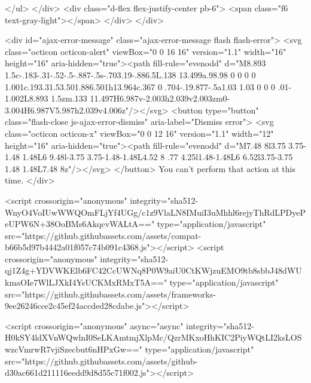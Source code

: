     </ul>
  </div>
  <div class="d-flex flex-justify-center pb-6">
    <span class="f6 text-gray-light"></span>
  </div>
</div>



  <div id="ajax-error-message" class="ajax-error-message flash flash-error">
    <svg class="octicon octicon-alert" viewBox="0 0 16 16" version="1.1" width="16" height="16" aria-hidden="true"><path fill-rule="evenodd" d="M8.893 1.5c-.183-.31-.52-.5-.887-.5s-.703.19-.886.5L.138 13.499a.98.98 0 0 0 0 1.001c.193.31.53.501.886.501h13.964c.367 0 .704-.19.877-.5a1.03 1.03 0 0 0 .01-1.002L8.893 1.5zm.133 11.497H6.987v-2.003h2.039v2.003zm0-3.004H6.987V5.987h2.039v4.006z"/></svg>
    <button type="button" class="flash-close js-ajax-error-dismiss" aria-label="Dismiss error">
      <svg class="octicon octicon-x" viewBox="0 0 12 16" version="1.1" width="12" height="16" aria-hidden="true"><path fill-rule="evenodd" d="M7.48 8l3.75 3.75-1.48 1.48L6 9.48l-3.75 3.75-1.48-1.48L4.52 8 .77 4.25l1.48-1.48L6 6.52l3.75-3.75 1.48 1.48L7.48 8z"/></svg>
    </button>
    You can’t perform that action at this time.
  </div>


    <script crossorigin="anonymous" integrity="sha512-WnyO4VoIUwWWQOmFLjYf4UGg/c1z9VlaLN8IMuiI3uMhhl6rejyThRdLPDyePeUPW6N+38OoBMs6AkqcvWALtA==" type="application/javascript" src="https://github.githubassets.com/assets/compat-b66b5d97b4442a01f057c74b091c4368.js"></script>
    <script crossorigin="anonymous" integrity="sha512-qj1Z4g+YDVWKElb6FC42CcUWNq8P0W9aiU0CtKWjzuEMO9tb8sbbJ48dWUkmaOIe7WlLJXkI4YsUCKMxRMxT5A==" type="application/javascript" src="https://github.githubassets.com/assets/frameworks-9ee26246cce2c45ef24accded28cdabe.js"></script>
    
    <script crossorigin="anonymous" async="async" integrity="sha512-H0kSY4ldXVnWQwlnI0SeLKAmtmjXlpMc/QzrMKxoHhKIC2PiyWQtLI2ksLOSwzcVmrwR7vjiSzecbut6nHPxGw==" type="application/javascript" src="https://github.githubassets.com/assets/github-d30ac661d211116eedd9d8d55c71f002.js"></script>
    
    
    
